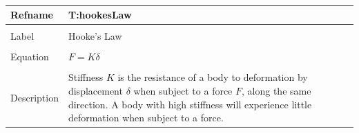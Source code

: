 \documentclass[12pt]{article}
\begin{document}
~\newline
\noindent \begin{minipage}{\textwidth}
\begin{tabular}{p{} p{}}
\toprule \textbf{Refname} & \textbf{T:hookesLaw}
\label{T:hookesLaw}
\\ \midrule \\
Label & Hooke's Law
\\ \midrule \\
Equation & $F=K δ$
\\ \midrule \\
Description & Stiffness $K$ is the resistance of a body to deformation by displacement $δ$ when subject to a force $F$, along the same direction. A body with high stiffness will experience little deformation when subject to a force.
\\ \bottomrule \end{tabular}
\end{minipage}\\
\end{document}

